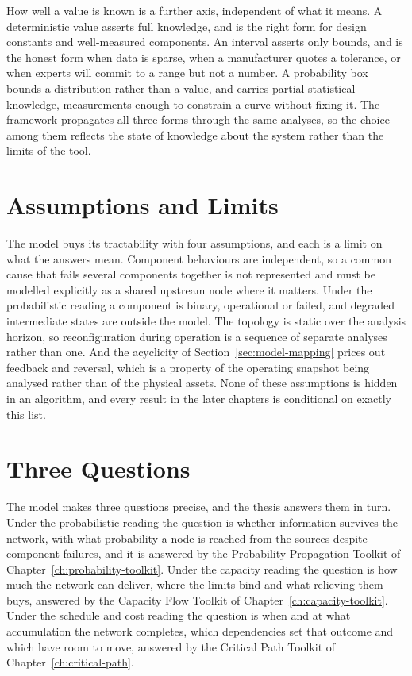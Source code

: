 \documentclass[12pt]{report}
\begin{document}
How well a value is known is a further axis, independent of what it
means. A deterministic value asserts full knowledge, and is the right
form for design constants and well-measured components. An interval
asserts only bounds, and is the honest form when data is sparse, when a
manufacturer quotes a tolerance, or when experts will commit to a range
but not a number. A probability box bounds a distribution rather than a
value, and carries partial statistical knowledge, measurements enough to
constrain a curve without fixing it. The framework propagates all three
forms through the same analyses, so the choice among them reflects the
state of knowledge about the system rather than the limits of the tool.

\section{Assumptions and Limits}
\label{sec:model-assumptions}

The model buys its tractability with four assumptions, and each is a
limit on what the answers mean. Component behaviours are independent, so
a common cause that fails several components together is not represented
and must be modelled explicitly as a shared upstream node where it
matters. Under the probabilistic reading a component is binary,
operational or failed, and degraded intermediate states are outside the
model. The topology is static over the analysis horizon, so
reconfiguration during operation is a sequence of separate analyses
rather than one. And the acyclicity of Section~\ref{sec:model-mapping}
prices out feedback and reversal, which is a property of the operating
snapshot being analysed rather than of the physical assets. None of
these assumptions is hidden in an algorithm, and every result in the
later chapters is conditional on exactly this list.

\section{Three Questions}
\label{sec:model-questions}

The model makes three questions precise, and the thesis answers them in
turn. Under the probabilistic reading the question is whether information
survives the network, with what probability a node is reached from the
sources despite component failures, and it is answered by the Probability
Propagation Toolkit of Chapter~\ref{ch:probability-toolkit}. Under the
capacity reading the question is how much the network can deliver, where
the limits bind and what relieving them buys, answered by the Capacity
Flow Toolkit of Chapter~\ref{ch:capacity-toolkit}. Under the schedule and
cost reading the question is when and at what accumulation the network
completes, which dependencies set that outcome and which have room to
move, answered by the Critical Path Toolkit of
Chapter~\ref{ch:critical-path}.
\end{document}

